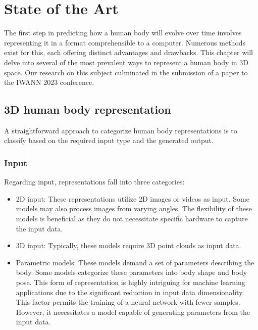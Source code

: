 
\chapter{State of the Art}\label{stateoftheart}

The first step in predicting how a human body will evolve over time involves
representing it in a format comprehensible to a computer. Numerous methods
exist for this, each offering distinct advantages and drawbacks. This chapter
will delve into several of the most prevalent ways to represent a human body in
3D space. Our research on this subject culminated in the submission of a paper
to the IWANN 2023 conference.

\section{3D human body representation}

A straightforward approach to categorize human body representations is to
classify based on the required input type and the generated output.

\subsection{Input}

Regarding input, representations fall into three categories:

\begin{itemize}
    \item 2D input: These representations utilize 2D images or videos as input. Some models may also process images from varying angles. The flexibility of these models is beneficial as they do not necessitate specific hardware to capture the input data.
    \item 3D input: Typically, these models require 3D point clouds as input data.
    \item Parametric models: These models demand a set of parameters describing the body.
          Some models categorize these parameters into body shape and body pose. This
          form of representation is highly intriguing for machine learning applications
          due to the significant reduction in input data dimensionality. This factor
          permits the training of a neural network with fewer samples. However, it
          necessitates a model capable of generating parameters from the input data.
\end{itemize}

